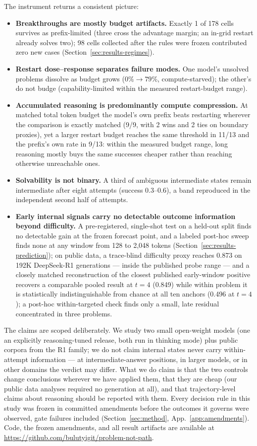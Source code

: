 The instrument returns a consistent picture:

\begin{itemize}
\item \textbf{Breakthroughs are mostly budget artifacts.} Exactly 1 of 178
cells survives as prefix-limited (three cross the advantage margin; an
in-grid restart already solves two); 98 cells collected after the
rules were frozen contributed zero new cases
(Section~\ref{sec:results-regimes}).
\item \textbf{Restart dose--response separates failure modes.} One model's
unsolved problems dissolve as budget grows ($0\%\to79\%$,
compute-starved); the other's do not budge (capability-limited within
the measured restart-budget range).
\item \textbf{Accumulated reasoning is predominantly compute
compression.} At matched total token budget the model's own prefix beats
restarting wherever the comparison is exactly matched (9/9, with 2 wins
and 2 ties on boundary proxies), yet a larger restart budget reaches the
same threshold in 11/13 and the prefix's own rate in 9/13: within the
measured budget range, long reasoning mostly buys the same successes
cheaper rather than reaching otherwise unreachable ones.
\item \textbf{Solvability is not binary.} A third of ambiguous
intermediate states remain intermediate after eight attempts (success
$0.3$--$0.6$), a band reproduced in the independent second half of
attempts.
\item \textbf{Early internal signals carry no detectable outcome
information beyond difficulty.} A pre-registered, single-shot test on a
held-out split finds no detectable gain at the frozen forecast point, and
a labeled post-hoc sweep finds none at any window from 128 to 2,048
tokens (Section~\ref{sec:results-prediction}); on public data, a
trace-blind difficulty proxy reaches 0.873 on 192K DeepSeek-R1
generations --- inside the published probe range --- and
a closely matched reconstruction of the closest published early-window
positive recovers a comparable pooled result at $t{=}4$ (0.849)
while within problem it is statistically indistinguishable from chance at
all ten anchors (0.496 at $t{=}4$); a post-hoc within-targeted check
finds only a small, late residual concentrated in three problems.
\end{itemize}

The claims are scoped deliberately. We study two small open-weight models
(one an explicitly reasoning-tuned release, both run in thinking mode)
plus public corpora from the R1 family; we do not claim internal states
never carry within-attempt information --- at intermediate-answer
positions, in larger models, or in other domains the verdict may differ. What we do claim is that the two controls change
conclusions wherever we have applied them, that they are cheap (our public
data analyses required no generation at all), and that trajectory-level
claims about reasoning should be reported with them. Every
decision rule in this study was frozen in committed amendments before the
outcomes it governs were observed, gate failures included
(Section~\ref{sec:method}, App.~\ref{app:amendments}). Code, the frozen
amendments, and all result artifacts are available at
\url{https://github.com/bulutyigit/problem-not-path}.
